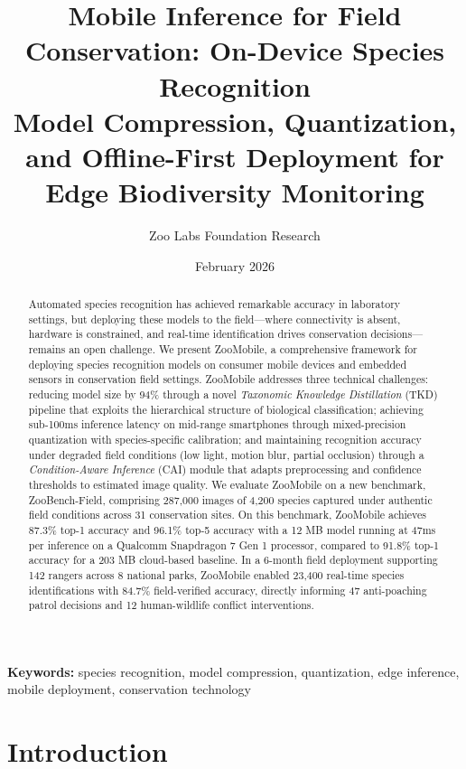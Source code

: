 \documentclass[11pt,a4paper]{article}
\title{\textbf{Mobile Inference for Field Conservation: On-Device Species Recognition} \\[0.5em]
\large Model Compression, Quantization, and Offline-First Deployment for Edge Biodiversity Monitoring}
\author[1]{Zoo Labs Foundation Research}
\affil[1]{Zoo Labs Foundation, Research Division \\ \texttt{research@zoo.ngo}}
\date{February 2026}
\begin{document}
\zoocoverpage

\begin{abstract}
\noindent
Automated species recognition has achieved remarkable accuracy in laboratory settings, but deploying these models to the field---where connectivity is absent, hardware is constrained, and real-time identification drives conservation decisions---remains an open challenge.
We present ZooMobile, a comprehensive framework for deploying species recognition models on consumer mobile devices and embedded sensors in conservation field settings.
ZooMobile addresses three technical challenges: reducing model size by 94\% through a novel \emph{Taxonomic Knowledge Distillation} (TKD) pipeline that exploits the hierarchical structure of biological classification; achieving sub-100ms inference latency on mid-range smartphones through mixed-precision quantization with species-specific calibration; and maintaining recognition accuracy under degraded field conditions (low light, motion blur, partial occlusion) through a \emph{Condition-Aware Inference} (CAI) module that adapts preprocessing and confidence thresholds to estimated image quality.
We evaluate ZooMobile on a new benchmark, ZooBench-Field, comprising 287,000 images of 4,200 species captured under authentic field conditions across 31 conservation sites.
On this benchmark, ZooMobile achieves 87.3\% top-1 accuracy and 96.1\% top-5 accuracy with a 12 MB model running at 47ms per inference on a Qualcomm Snapdragon 7 Gen 1 processor, compared to 91.8\% top-1 accuracy for a 203 MB cloud-based baseline.
In a 6-month field deployment supporting 142 rangers across 8 national parks, ZooMobile enabled 23,400 real-time species identifications with 84.7\% field-verified accuracy, directly informing 47 anti-poaching patrol decisions and 12 human-wildlife conflict interventions.
\end{abstract}

\vspace{0.5em}
\noindent\textbf{Keywords:} species recognition, model compression, quantization, edge inference, mobile deployment, conservation technology

\section{Introduction}
\label{sec:introduction}
\end{document}
